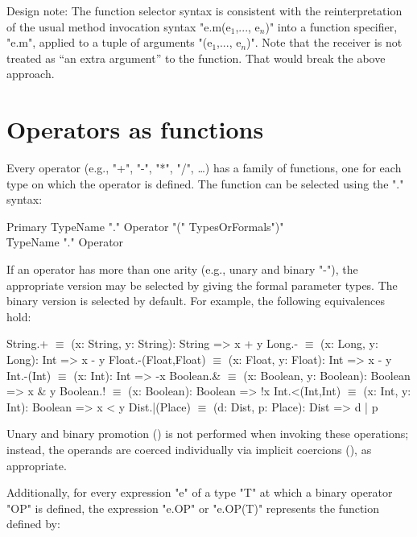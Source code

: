 \begin{note}
Design note: The function selector syntax is consistent with the
reinterpretation of the usual method invocation syntax
\xcdmath"e.m(e$_1$,..., e$_n$)"
into a function specifier, \xcd"e.m", applied to a tuple of arguments
\xcdmath"(e$_1$,..., e$_n$)". Note that the receiver is not
treated as ``an extra argument'' to the
function. That would break the above approach.
\end{note}


\section{Operators as functions}

Every operator (e.g.,
\xcd"+",
\xcd"-",
\xcd"*",
\xcd"/",
\dots) has a family of functions, one for
each type on which the operator is defined. The function can be
selected using the "." syntax:

\begin{grammar}
Primary \: TypeName \xcd"." Operator \xcd"(" TypesOrFormals\opt \xcd")" \\
        \| TypeName \xcd"." Operator \\
\end{grammar}

If an operator has more than one arity (e.g., unary and binary
\xcd"-"), the appropriate version may be selected by giving the
formal parameter types.  The binary version is selected by
default.
For example, the following equivalences hold:

\begin{xtenmath}
String.+             $\equiv$ (x: String, y: String): String => x + y
Long.-               $\equiv$ (x: Long, y: Long): Int => x - y
Float.-(Float,Float) $\equiv$ (x: Float, y: Float): Int => x - y
Int.-(Int)           $\equiv$ (x: Int): Int => -x
Boolean.&            $\equiv$ (x: Boolean, y: Boolean): Boolean => x & y
Boolean.!            $\equiv$ (x: Boolean): Boolean => !x
Int.<(Int,Int)       $\equiv$ (x: Int, y: Int): Boolean => x < y
Dist.|(Place)        $\equiv$ (d: Dist, p: Place): Dist => d | p
\end{xtenmath}

Unary and binary promotion () is not performed
when invoking these
operations; instead, the operands are coerced individually via implicit
coercions (), as appropriate.

Additionally, for every expression \xcd"e" of a type \xcd"T" at which a binary
operator \xcd"OP" is defined, the expression \xcd"e.OP" or
\xcd"e.OP(T)" represents the function
defined by:

